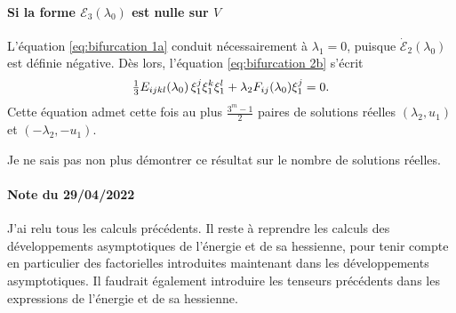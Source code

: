 \documentclass{article}
\newcommand{\nocomma}{}
\begin{document}
\paragraph{Si la forme $\mathcal{E}_3 (\lambda_0)$ est nulle sur
$V$}L'{\'e}quation \eqref{eq:bifurcation 1a} conduit n{\'e}cessairement {\`a}
$\lambda_1 = 0$, puisque $\dot{\mathcal{E}}_2 (\lambda_0)$ est d{\'e}finie
n{\'e}gative. D{\`e}s lors, l'{\'e}quation \eqref{eq:bifurcation 2b}
s'{\'e}crit
\begin{equation}
  \tfrac{1}{3} E_{i \nocomma j \nocomma k \nocomma l} (\lambda_0)
  \hspace{0.17em} \xi_1^j \xi_1^k \xi_1^l + \lambda_2 F_{i \nocomma j}
  (\lambda_0) \xi_1^j = 0.
\end{equation}
Cette {\'e}quation admet cette fois au plus $\frac{3^m - 1}{2}$ paires de
solutions r{\'e}elles $(\lambda_2, u_1)$ et $(- \lambda_2, - u_1)$.

\begin{remark}
  Je ne sais pas non plus d{\'e}montrer ce r{\'e}sultat sur le nombre de
  solutions r{\'e}elles.
\end{remark}

\begin{tmframed}
  \paragraph{Note du 29/04/2022}J'ai relu tous les calculs pr{\'e}c{\'e}dents.
  Il reste {\`a} reprendre les calculs des d{\'e}veloppements asymptotiques de
  l'{\'e}nergie et de sa hessienne, pour tenir compte en particulier des
  factorielles introduites maintenant dans les d{\'e}veloppements
  asymptotiques. Il faudrait {\'e}galement introduire les tenseurs
  pr{\'e}c{\'e}dents dans les expressions de l'{\'e}nergie et de sa hessienne.
\end{tmframed}
\end{document}
